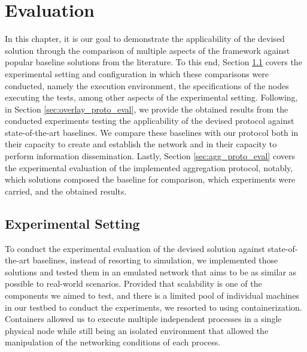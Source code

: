 

\chapter{Evaluation}
\label{cha:evaluation}

In this chapter, it is our goal to demonstrate the applicability of the devised solution through the comparison of multiple aspects of the framework against popular baseline solutions from the literature. To this end, Section \ref{sec:exp_setting_conf} covers the experimental setting and configuration in which these comparisons were conducted, namely the execution environment, the specifications of the nodes executing the tests, among other aspects of the experimental setting. Following, in Section \ref{sec:overlay_proto_eval}, we provide the obtained results from the conducted experiments testing the applicability of the devised protocol against state-of-the-art baselines. We compare these baselines with our protocol both in their capacity to create and establish the network and in their capacity to perform information dissemination. Lastly, Section \ref{sec:agg_proto_eval} covers the experimental evaluation of the implemented aggregation protocol, notably, which solutions composed the baseline for comparison, which experiments were carried, and the obtained results.

\section{Experimental Setting} \label{sec:exp_setting_conf}

To conduct the experimental evaluation of the devised solution against state-of-the-art baselines, instead of resorting to simulation, we implemented those solutions and tested them in an emulated network that aims to be as similar as possible to real-world scenarios. Provided that scalability is one of the components we aimed to test, and there is a limited pool of individual machines in our testbed to conduct the experiments, we resorted to using containerization. Containers allowed us to execute multiple independent processes in a single physical node while still being an isolated environment that allowed the manipulation of the networking conditions of each process. 


